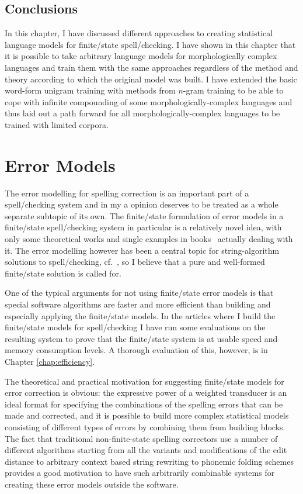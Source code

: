 \documentclass[officiallayout]{unihelcompling}
\begin{document}
\section{Conclusions}

In this chapter, I have discussed different approaches to creating
statistical language models for finite\-/state spell\-/checking. I have
shown in this chapter that it is possible to take arbitrary language models for
morphologically complex languages and train them with the same approaches
regardless of the method and theory according to which the original model was
built. I have extended the basic word-form unigram training with methods from
\(n\)-gram training to be able to cope with infinite compounding of some
morphologically-complex languages and thus laid out a path forward for all
morphologically-complex languages to be trained with limited corpora.


\chapter{Error Models}
\label{chap:error-models}

The error modelling for spelling correction is an important part of a
spell\-/checking system and in my a opinion deserves to be treated as a whole
separate subtopic of its own. The finite\-/state formulation of error models in
a finite\-/state spell\-/checking system in particular is a relatively novel
idea, with only some theoretical works
\citep{agata2002typographical,mohri2003edit} and single examples in
books~\citep{beesley2003finite} actually dealing with it.  The error modelling
however has been a central topic for string-algorithm solutions to
spell\-/checking,
cf.~\citet{kukich1992spelling,mitton2009ordering,deorowicz2005correcting}, so I
believe that a pure and well-formed finite\-/state solution is called for.

One of the typical arguments for not using finite\-/state error models is that
special software algorithms are faster and more efficient than building and
especially applying the finite\-/state models. In the articles where I build
the finite\-/state models for spell\-/checking I have run some evaluations on
the resulting system to prove that the finite\-/state system is at usable speed
and memory consumption levels. A thorough evaluation of this, however, is in
Chapter \ref{chap:efficiency}.

The theoretical and practical motivation for suggesting finite\-/state models
for error correction is obvious: the expressive power of a weighted transducer
is an ideal format for specifying the combinations of the spelling errors that
can be made and corrected, and it is possible to build more complex statistical
models consisting of different types of errors by combining them from building
blocks. The fact that traditional non-finite-state spelling correctors use a
number of different algorithms starting from all the variants and modifications
of the edit distance to arbitrary context based string rewriting to phonemic
folding schemes provides a good motivation to have such arbitrarily combinable
systems for creating these error models outside the software.
\end{document}
